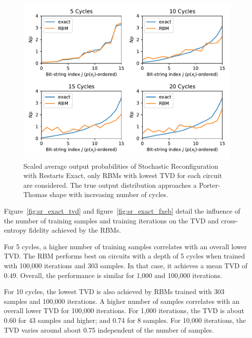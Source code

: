 \begin{figure}[H]
  \centering
  \includegraphics[width=\textwidth]{figures/results/SR-restarts-not-learned/avgBestPDF.pdf}
  \caption[Averaged best performing scaled output probabilities of Stochastic Reconfiguration with Restarts Exact]{
    Scaled average output probabilities of Stochastic Reconfiguration with Restarts Exact, only RBMs with lowest
    TVD for each circuit are considered. The true 
    output distribution approaches a Porter-Thomas shape with increasing number of cycles.}
  \label{fig:sr_exact_bestPDF}
\end{figure}

Figure~\ref{fig:sr_exact_tvd} and figure~\ref{fig:sr_exact_fxeb} detail the influence of the 
number of training samples and training iterations on the TVD and cross-entropy fidelity achieved by 
the RBMs. 

For 5 cycles, a higher number of training samples 
correlates with an overall lower TVD. The RBM performs best on 
circuits with a depth of 5 cycles when trained with 100,000 iterations and 303 samples. In that case, 
it achieves a mean TVD of $0.49$. Overall, the performance is similar for 1,000 and 100,000 iterations.

For 10 cycles, the lowest TVD is also achieved by RBMs trained with 303 samples and 100,000 iterations.
A higher number of samples correlates with an overall lower TVD for 100,000 iterations. For 1,000 iterations, 
the TVD is about 0.60 for 43 samples and higher; and 0.74 for 8 samples. For 10,000 iterations, the TVD varies 
around about 0.75 independent of the number of samples. 


